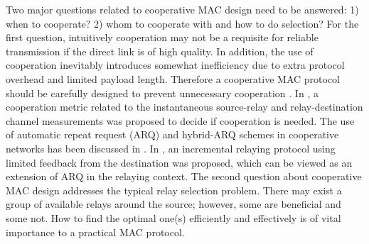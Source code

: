 \documentclass[journal,twoside,final]{IEEEtran}
\begin{document}
Two major questions related to cooperative MAC design need to be answered: 1) when to cooperate? 2) whom to cooperate with and how to do selection? For the first question, intuitively cooperation may not be a requisite for reliable transmission if the direct link is of high quality. In addition, the use of cooperation inevitably introduces somewhat inefficiency due to extra protocol overhead and limited payload length.
Therefore a cooperative MAC protocol should be carefully designed to prevent unnecessary cooperation \cite{shan2009}.
In \cite{Ibrahim2008}, a cooperation metric related to the instantaneous source-relay and relay-destination channel measurements was proposed to decide if cooperation is needed.
The use of automatic repeat request (ARQ) and hybrid-ARQ schemes in cooperative networks has been discussed in \cite{Zhao2005, Dianati2006}.
In \cite{Laneman2004}, an incremental relaying protocol using limited feedback from the destination was proposed, which can be viewed as an extension of ARQ in the relaying context.
The second question about cooperative MAC design addresses the typical relay selection problem. There may exist a group of available relays around the source; however, some are beneficial and some not. How to find the optimal one(s) efficiently and effectively is of vital importance to a practical MAC protocol.
\IEEEpubidadjcol
\end{document}
